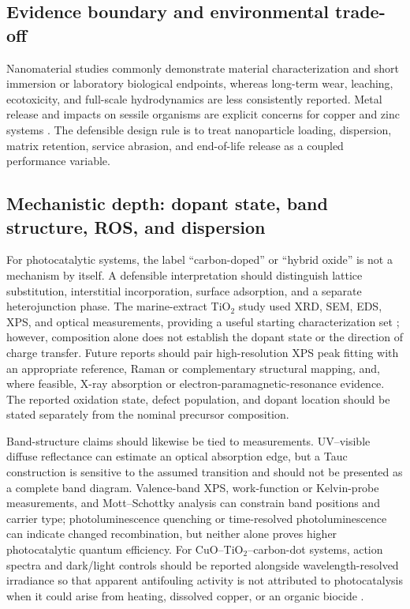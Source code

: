 \subsection{Evidence boundary and environmental trade-off}
Nanomaterial studies commonly demonstrate material characterization and short immersion or laboratory biological endpoints, whereas long-term wear, leaching, ecotoxicity, and full-scale hydrodynamics are less consistently reported. Metal release and impacts on sessile organisms are explicit concerns for copper and zinc systems \cite{miller_nano_2020}. The defensible design rule is to treat nanoparticle loading, dispersion, matrix retention, service abrasion, and end-of-life release as a coupled performance variable.

\subsection{Mechanistic depth: dopant state, band structure, ROS, and dispersion}
For photocatalytic systems, the label ``carbon-doped'' or ``hybrid oxide'' is not a mechanism by itself. A defensible interpretation should distinguish lattice substitution, interstitial incorporation, surface adsorption, and a separate heterojunction phase. The marine-extract TiO$_2$ study used XRD, SEM, EDS, XPS, and optical measurements, providing a useful starting characterization set \cite{alarif_green_2023}; however, composition alone does not establish the dopant state or the direction of charge transfer. Future reports should pair high-resolution XPS peak fitting with an appropriate reference, Raman or complementary structural mapping, and, where feasible, X-ray absorption or electron-paramagnetic-resonance evidence. The reported oxidation state, defect population, and dopant location should be stated separately from the nominal precursor composition.

Band-structure claims should likewise be tied to measurements. UV--visible diffuse reflectance can estimate an optical absorption edge, but a Tauc construction is sensitive to the assumed transition and should not be presented as a complete band diagram. Valence-band XPS, work-function or Kelvin-probe measurements, and Mott--Schottky analysis can constrain band positions and carrier type; photoluminescence quenching or time-resolved photoluminescence can indicate changed recombination, but neither alone proves higher photocatalytic quantum efficiency. For CuO--TiO$_2$--carbon-dot systems, action spectra and dark/light controls should be reported alongside wavelength-resolved irradiance so that apparent antifouling activity is not attributed to photocatalysis when it could arise from heating, dissolved copper, or an organic biocide \cite{ashraf_photocatalytic_2024}.

